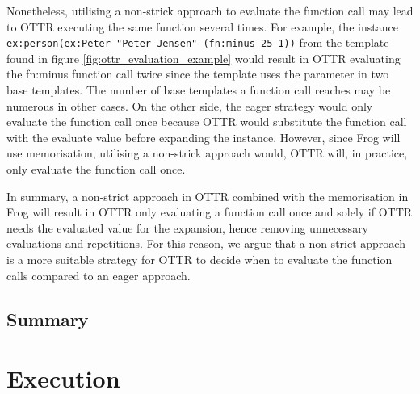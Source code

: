 \para 
Nonetheless, utilising a non-strick approach to evaluate the function call may lead to OTTR executing the same function several times. For example, the instance \lstinline{ex:person(ex:Peter "Peter Jensen" (fn:minus 25 1))} from the template found in figure \ref{fig:ottr_evaluation_example} would result in OTTR evaluating the fn:minus function call twice since the template uses the parameter in two base templates. The number of base templates a function call reaches may be numerous in other cases. On the other side, the eager strategy would only evaluate the function call once because OTTR would substitute the function call with the evaluate value before expanding the instance. However, since Frog will use memorisation, utilising a non-strick approach would, OTTR will, in practice, only evaluate the function call once.

\para
In summary, a non-strict approach in OTTR combined with the memorisation in Frog will result in OTTR only evaluating a function call once and solely if OTTR needs the evaluated value for the expansion, hence removing unnecessary evaluations and repetitions. For this reason, we argue that a non-strict approach is a more suitable strategy for OTTR to decide when to evaluate the function calls compared to an eager approach. 

\subsection{Summary}

\section{Execution}